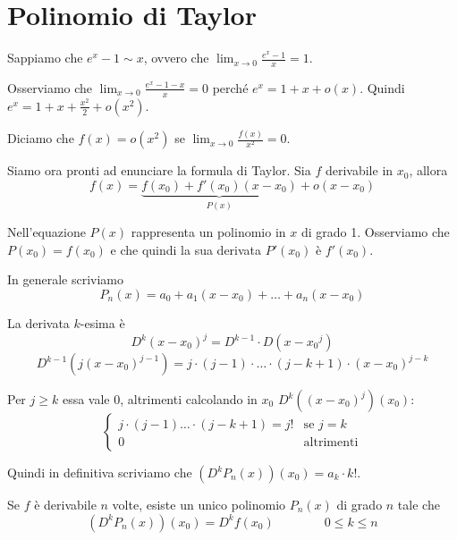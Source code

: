 \section{Polinomio di Taylor}

Sappiamo che $e^x-1 \sim x$, ovvero che $\lim_{x \to 0} \frac{e^x-1}{x} = 1$.

Osserviamo che $\lim_{x \to 0} \frac{e^x-1-x}{x} = 0$ perché $e^x=1+x+o(x)$. Quindi $e^x = 1 + x + \frac{x^2}{2} + o(x^2)$.

Diciamo che $f(x) = o(x^2)$ se $\lim_{x \to 0} \frac{f(x)}{x^2} = 0$.

Siamo ora pronti ad enunciare la formula di Taylor. Sia $f$ derivabile in $x_0$, allora
\begin{equation*}
f(x) = \underbrace{f(x_0) + f'(x_0)(x-x_0)}_{P(x)} + o(x-x_0)
\end{equation*}

Nell'equazione $P(x)$ rappresenta un polinomio in $x$ di grado 1. Osserviamo che $P(x_0) = f(x_0)$ e che quindi la sua derivata $P'(x_0)$ è $f'(x_0)$.

In generale scriviamo
\begin{equation*}
P_n (x) = a_0 + a_1 (x-x_0) + \ldots + a_n (x-x_0)
\end{equation*}

La derivata $k$-esima è
\begin{equation*}
D^k (x-x_0)^j = D^{k-1} \cdot D(x-{x_0}^j)
\end{equation*}
\begin{equation*}
D^{k-1} (j(x-x_0)^{j-1}) = j \cdot (j-1) \cdot \ldots \cdot (j-k+1) \cdot (x-x_0)^{j-k}
\end{equation*}

Per $j \ge k$ essa vale 0, altrimenti calcolando in $x_0$ $D^k ((x-x_0)^j)(x_0)$:
\begin{equation*}
\begin{cases}
j \cdot (j-1) \ldots \cdot (j-k+1) = j! & \mbox{se } j = k \\
0 & \mbox{altrimenti}
\end{cases}
\end{equation*}

Quindi in definitiva scriviamo che $(D^k P_n(x)) (x_0) = a_k \cdot k!$.

Se $f$ è derivabile $n$ volte, esiste un unico polinomio $P_n(x)$ di grado $n$ tale che
\begin{equation*}
(D^k P_n(x)) (x_0) = D^k f(x_0) \qquad \qquad 0 \le k \le n
\end{equation*}

